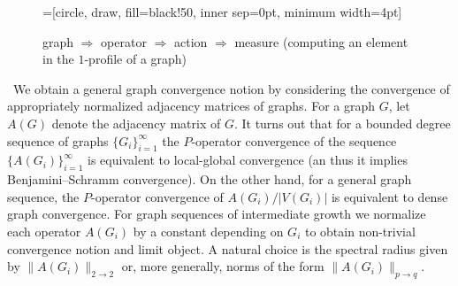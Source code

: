 \documentclass[a4wider]{amsart}
\newenvironment{psmallmatrix}
  {\left(\begin{smallmatrix}}
  {\end{smallmatrix}\right)}
\theoremstyle{definitionbreak}\newtheorem{D}[theorem]{Definition}
\theoremstyle{definitionbreak}\newtheorem*{D*}{Definition}
\begin{document}
\begin{figure}
=[circle, draw, fill=black!50,
                        inner sep=0pt, minimum width=4pt]


\quad
\caption{graph $\Rightarrow$ operator $\Rightarrow$ action $\Rightarrow$ measure (computing an element in the $1$-profile of a graph)}
\end{figure}

~We obtain a general graph convergence notion by considering the convergence of appropriately normalized adjacency matrices of graphs. For a graph $G$, let $A(G)$ denote the adjacency matrix of $G$. It turns out that for a bounded degree sequence of graphs $\{G_i\}_{i=1}^\infty$ the $P$-operator convergence of the sequence $\{A(G_i)\}_{i=1}^\infty$ is equivalent to local-global convergence (an thus it implies Benjamini--Schramm convergence). On the other hand, for a general graph sequence, the $P$-operator convergence of $A(G_i)/|V(G_i)|$ is equivalent to dense graph convergence. For graph sequences of intermediate growth we  normalize each operator $A(G_i)$ by a constant depending on $G_i$ to obtain non-trivial convergence notion and limit object. A natural choice is the  spectral radius given by $\|A(G_i)\|_{2\to 2}$ or, more generally, norms of the form $\|A(G_i)\|_{p\to q}$.
\end{document}
